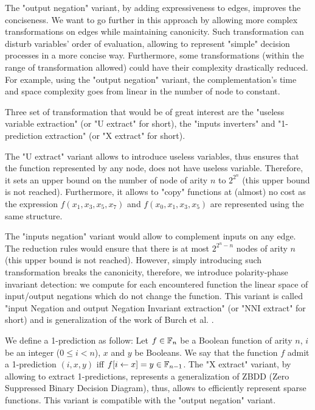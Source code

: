 \documentclass[a4paper,10pt]{article}
\begin{document}
The "output negation" variant, by adding expressiveness to edges, improves the conciseness.
We want to go further in this approach by allowing more complex transformations on edges while maintaining canonicity.
Such transformation can disturb variables' order of evaluation, allowing to represent "simple" decision processes in a more concise way.
Furthermore, some transformations (within the range of transformation allowed) could have their complexity drastically reduced.
For example, using the "output negation" variant, the complementation's time and space complexity goes from linear in the number of node to constant.

Three set of transformation that would be of great interest are the "useless variable extraction" (or "U extract" for short), the "inputs inverters" and "1-prediction extraction" (or "X extract" for short).


The "U extract" variant allows to introduce useless variables, thus ensures that the function represented by any node, does not have useless variable.
Therefore, it sets an upper bound on the number of node of arity $n$ to $2^{2^n}$ (this upper bound is not reached).
Furthermore, it allows to "copy" functions at (almost) no cost as the expression $f(x_1, x_3, x_5, x_7)$ and $f(x_0, x_1, x_3, x_5)$ are represented using the same structure.


The "inputs negation" variant would allow to complement inputs on any edge.
The reduction rules would ensure that there is at most $2^{2^n-n}$ nodes of arity $n$ (this upper bound is not reached).
However, simply introducing such transformation breaks the canonicity, therefore, we introduce polarity-phase invariant detection: we compute for each encountered function the linear space of input/output negations which do not change the function.
This variant is called "input Negation and output Negation Invariant extraction" (or "NNI extract" for short) and is generalization of the work of Burch et al. \cite{BurchLong1992}.

We define a 1-prediction as follow:
Let $f\in\mathbb{F}_n$ be a Boolean function of arity $n$, $i$ be an integer ($0\leq i < n$), $x$ and $y$ be Booleans.
We say that the function $f$ admit a 1-prediction $(i, x, y)$ iff $f[i\leftarrow x] = y \in\mathbb{F}_{n-1}$.
The "X extract" variant, by allowing to extract 1-predictions, represents a generalization of ZBDD (Zero Suppressed Binary Decision Diagram), thus, allows to efficiently represent sparse functions.
This variant is compatible with the "output negation" variant.
\end{document}
